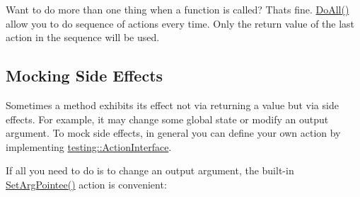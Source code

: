 Want to do more than one thing when a function is called? That\textquotesingle{}s fine. {\ttfamily \mbox{\hyperlink{namespacetesting_a3824c79dc6e9e05c337a675e82da2045}{Do\+All()}}} allow you to do sequence of actions every time. Only the return value of the last action in the sequence will be used.


\begin{DoxyCode}{0}
\DoxyCodeLine{}
\DoxyCodeLine{ \textcolor{keyword}{public}:}
\DoxyCodeLine{\};}
\DoxyCodeLine{}
\end{DoxyCode}


\subsection*{Mocking Side Effects}

Sometimes a method exhibits its effect not via returning a value but via side effects. For example, it may change some global state or modify an output argument. To mock side effects, in general you can define your own action by implementing {\ttfamily \mbox{\hyperlink{classtesting_1_1_action_interface}{testing\+::\+Action\+Interface}}}.

If all you need to do is to change an output argument, the built-\/in {\ttfamily \mbox{\hyperlink{namespacetesting_a6dbe77dc170c495ea300dd9d74ed4595}{Set\+Arg\+Pointee()}}} action is convenient\+:



